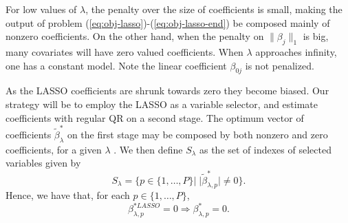 
For low values of $\lambda$, the penalty over the size of coefficients is small, making the output of problem (\ref{eq:obj-lasso})-(\ref{eq:obj-lasso-end}) be composed mainly of nonzero coefficients. On the other hand, when the penalty on $\| \beta_j \|_1$ is big, many covariates will have zero valued coefficients. When $\lambda$ approaches infinity, one has a constant model. 
Note the linear coefficient $\beta_{0j}$ is not penalized.

As the LASSO coefficients are shrunk towards zero they become biased. Our strategy will be to employ the LASSO as a variable selector, and estimate coefficients with regular QR on a second stage. 
The optimum vector of coefficients $\tilde \beta_\lambda^{*}$ on the first stage may be composed by both nonzero and zero coefficients, for a given $\lambda$ . 
We then define $S_\lambda$ as the set of indexes of selected variables given by
\begin{equation*}
S_\lambda = \{ p \in \{ 1,\dots,P \} | \; |\tilde \beta^{*}_{\lambda,p}| \neq 0  \}.
\end{equation*}
Hence, we have that, for each $p \in \{ 1,\dots,P \}$,
$$\beta^{*LASSO}_{\lambda,p} = 0 \Longrightarrow \beta^{*}_{\lambda,p} = 0.$$

